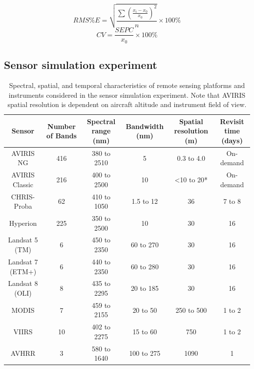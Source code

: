 \[ RMS\%E = \sqrt{\frac{\sum{{\left(\frac{x_i - x_0}{x_0} \right)}^2}}{n}} \times 100\% \]
\[ CV = \frac{SEPC}{x_0} \times 100\% \]

\subsection{Sensor simulation experiment}

\begin{table}
  \caption{%
    Spectral, spatial, and temporal characteristics of remote sensing platforms and instruments considered in the sensor simulation experiment.
    Note that AVIRIS spatial resolution is dependent on aircraft altitude and instrument field of view.
  }\label{tab:pecanrtm-sensors}
  \begin{tabular}{cccccc}
    \toprule
    Sensor & Number of Bands & Spectral range (nm) & Bandwidth (nm) & Spatial resolution (m) & Revisit time (days) \\
    \midrule
    AVIRIS NG & 416 & 380 to 2510 & 5 & 0.3 to 4.0 & On-demand \\
    AVIRIS Classic & 216 & 400 to 2500 & 10 & <10 to 20* & On-demand \\
    CHRIS-Proba & 62 & 410 to 1050 & 1.5 to 12 & 36 & 7 to 8 \\
    Hyperion & 225 & 350 to 2500 & 10 & 30 & 16 \\
    Landsat 5 (TM) & 6 & 450 to 2350 & 60 to 270 & 30 & 16 \\
    Landsat 7 (ETM+) & 6 & 440 to 2350 & 60 to 280 & 30 & 16 \\
    Landsat 8 (OLI) & 8 & 435 to 2295 & 20 to 185 & 30 & 16 \\
    MODIS & 7 & 459 to 2155 & 20 to 50 & 250 to 500 & 1 to 2 \\
    VIIRS & 10 & 402 to 2275 & 15 to 60 & 750 & 1 to 2 \\
    AVHRR & 3 & 580 to 1640 & 100 to 275 & 1090 & 1 \\
    \bottomrule
  \end{tabular}
\end{table}

